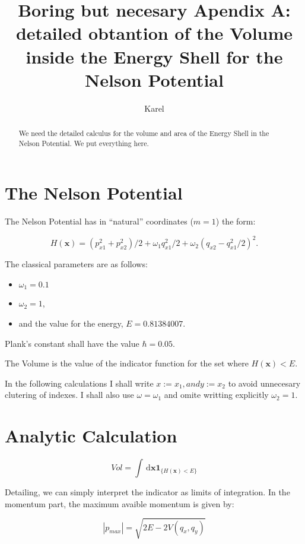 \documentclass[a4paper,12pt]{article}
\title{ Boring but necesary Apendix A: detailed obtantion of the
Volume inside the Energy Shell for the Nelson Potential}
\author{Karel}
\newcommand{\xfase}{\mathbf{x}}
\newcommand{\dif}{\, \mathrm{d}}
\newcommand{\indicator}[1]{\mathbf{1}_{ \{   #1 \} } }
\begin{document}
\maketitle

\begin{abstract}
We need the detailed calculus for the volume and area of
the Energy Shell in the Nelson Potential. We put everything here.
\end{abstract}


\section{The Nelson Potential}

The Nelson Potential has in ``natural'' coordinates ($m=1$) the form:

\begin{equation}\label{classicalhamiltonian}
H(\xfase)=(p_{x1}^2+p_{x2}^2)/2+\omega_1 q_{x1}^2/2+
\omega_2(q_{x2}-q_{x1}^2/2)^2.
\end{equation}

The classical parameters are as follows:
\begin{itemize}
\item  $\omega_1=0.1$ 
\item $\omega_2=1$,
\item and the value for the energy, $E=0.81384007$.
\end{itemize}

Plank's constant shall have the value  $\hbar=0.05$.

The Volume is the value of the indicator function for
the set where $H(\xfase)<E$. 

In the following calculations I shall write $x:=x_1, and y:=x_2$
to avoid unnecesary clutering of indexes. I shall also use
$\omega=\omega_1$ and omite writting explicitly  $\omega_2=1$.

\section{Analytic Calculation}

\begin{equation}
Vol=\int \dif\xfase \indicator{H(\xfase)<E}
\end{equation}

Detailing, we can simply interpret the indicator as limits of integration.
In the momentum part, the maximum avaible momentum is given by:

\begin{equation}
|p_{max}|=\sqrt{2 E- 2 V(q_x, q_y)}
\end{equation}
\end{document}
